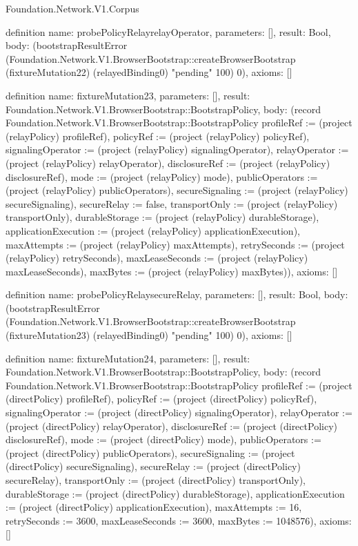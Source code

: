 \begin{lexlean}{Foundation.Network.V1.Corpus}
\begin{semanticmodule}
definition{
  name: probePolicyRelayrelayOperator,
  parameters: [],
  result: Bool,
  body: (bootstrapResultError (Foundation.Network.V1.BrowserBootstrap::createBrowserBootstrap (fixtureMutation22) (relayedBinding0) "pending" 100) 0),
  axioms: []
}

definition{
  name: fixtureMutation23,
  parameters: [],
  result: Foundation.Network.V1.BrowserBootstrap::BootstrapPolicy,
  body: (record Foundation.Network.V1.BrowserBootstrap::BootstrapPolicy {profileRef := (project (relayPolicy) profileRef), policyRef := (project (relayPolicy) policyRef), signalingOperator := (project (relayPolicy) signalingOperator), relayOperator := (project (relayPolicy) relayOperator), disclosureRef := (project (relayPolicy) disclosureRef), mode := (project (relayPolicy) mode), publicOperators := (project (relayPolicy) publicOperators), secureSignaling := (project (relayPolicy) secureSignaling), secureRelay := false, transportOnly := (project (relayPolicy) transportOnly), durableStorage := (project (relayPolicy) durableStorage), applicationExecution := (project (relayPolicy) applicationExecution), maxAttempts := (project (relayPolicy) maxAttempts), retrySeconds := (project (relayPolicy) retrySeconds), maxLeaseSeconds := (project (relayPolicy) maxLeaseSeconds), maxBytes := (project (relayPolicy) maxBytes)}),
  axioms: []
}

definition{
  name: probePolicyRelaysecureRelay,
  parameters: [],
  result: Bool,
  body: (bootstrapResultError (Foundation.Network.V1.BrowserBootstrap::createBrowserBootstrap (fixtureMutation23) (relayedBinding0) "pending" 100) 0),
  axioms: []
}

definition{
  name: fixtureMutation24,
  parameters: [],
  result: Foundation.Network.V1.BrowserBootstrap::BootstrapPolicy,
  body: (record Foundation.Network.V1.BrowserBootstrap::BootstrapPolicy {profileRef := (project (directPolicy) profileRef), policyRef := (project (directPolicy) policyRef), signalingOperator := (project (directPolicy) signalingOperator), relayOperator := (project (directPolicy) relayOperator), disclosureRef := (project (directPolicy) disclosureRef), mode := (project (directPolicy) mode), publicOperators := (project (directPolicy) publicOperators), secureSignaling := (project (directPolicy) secureSignaling), secureRelay := (project (directPolicy) secureRelay), transportOnly := (project (directPolicy) transportOnly), durableStorage := (project (directPolicy) durableStorage), applicationExecution := (project (directPolicy) applicationExecution), maxAttempts := 16, retrySeconds := 3600, maxLeaseSeconds := 3600, maxBytes := 1048576}),
  axioms: []
}


\end{semanticmodule}
\end{lexlean}
